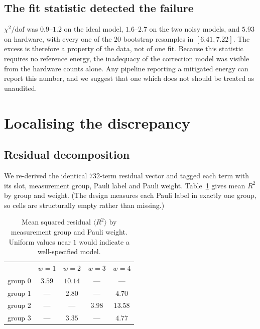 \documentclass[aps,prx,twocolumn,superscriptaddress,nofootinbib,floatfix]{revtex4-2}
\begin{document}
\subsection{The fit statistic detected the failure}
\label{sec:chi2}

$\chi^2/\mathrm{dof}$ was $0.9$--$1.2$ on the ideal model, $1.6$--$2.7$ on
the two noisy models, and $5.93$ on hardware, with every one of the $20$
bootstrap resamples in $[6.41,7.22]$. The excess is therefore a property
of the data, not of one fit. Because this statistic requires no reference
energy, the inadequacy of the correction model was visible from the
hardware counts alone. Any pipeline reporting a mitigated energy can
report this number, and we suggest that one which does not should be
treated as unaudited.

\section{Localising the discrepancy}

\subsection{Residual decomposition}

We re-derived the identical $732$-term residual vector and tagged each
term with its slot, measurement group, Pauli label and Pauli weight.
Table~\ref{tab:resid} gives mean $R^2$ by group and weight. (The design
measures each Pauli label in exactly one group, so cells are
structurally empty rather than missing.)

\begin{table}[t]
\caption{Mean squared residual $\langle R^2\rangle$ by measurement group
and Pauli weight. Uniform values near $1$ would indicate a well-specified
model.}
\label{tab:resid}
\begin{ruledtabular}
\begin{tabular}{lcccc}
 & $w{=}1$ & $w{=}2$ & $w{=}3$ & $w{=}4$ \\
\colrule
group 0 & $3.59$ & $\mathbf{10.14}$ & --- & --- \\
group 1 & --- & $2.80$ & --- & $4.70$ \\
group 2 & --- & --- & $3.98$ & $\mathbf{13.58}$ \\
group 3 & --- & $3.35$ & --- & $4.77$ \\
\end{tabular}
\end{ruledtabular}
\end{table}
\end{document}
